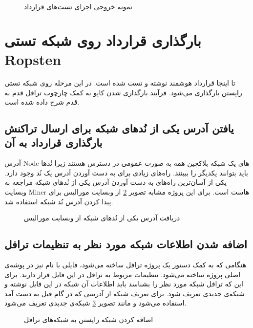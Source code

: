 \begin{figure}
\centerline{}
\caption{نمونه خروجی اجرای تست‌های قرارداد}
\label{fig:test-output}
\end{figure}

\section{بارگذاری قرارداد روی شبکه تستی \gls{Ropsten}}
تا اینجا قرارداد هوشمند نوشته و تست شده است.
در این مرحله روی شبکه تستی راپستن بارگذاری می‌شود.
فرآیند بارگذاری شدن کاپو به کمک چارچوب ترافل قدم به قدم شرح داده شده است.

\subsection{یافتن آدرس یکی از نُد‌های شبکه برای ارسال تراکنش بارگذاری قرارداد به آن}
آدرس
\gls{Node}
های یک شبکه بلاکچین همه به صورت عمومی در دسترس هستند زیرا نُدها باید بتوانند یکدیگر را ببینند.
راه‌های زیادی برای به دست آوردن آدرس یک نُد وجود دارد.
یکی از آسان‌ترین راه‌های به دست آوردن آدرس یکی از نُد‌های شبکه مراجعه به وبسایت
\gls{Miner}
هاست است.
برای این پروژه مشابه تصویر
\ref{fig:moralis}
از وبسایت مورالیس
برای پیدا کردن آدرس نُد شبکه استفاده شد.

\begin{figure}
\centerline{}
\caption{دریافت آدرس یکی از نُد‌های شبکه از وبسایت مورالیس}
\label{fig:moralis}
\end{figure}

\subsection{اضافه شدن اطلاعات شبکه مورد نظر به تنظیمات ترافل}
هنگامی که به کمک دستور
یک پروژه ترافل ساخته می‌شود، فایلی با نام
نیز در پوشه‌ی اصلی پروژه ساخته می‌شود.
تنظیمات مربوط به ترافل در این فایل قرار دارند.
برای این که ترافل شبکه مورد نظر را بشناسد باید اطلاعات آن شبکه در این فایل نوشته و شبکه‌ی جدیدی تعریف شود.
برای تعریف شبکه از آدرسی که در گام قبل به دست آمد استفاده می‌شود و مانند تصویر
\ref{fig:network-config}
شبکه‌ی جدیدی تعریف می‌شود.

\begin{figure}
\centerline{}
\caption{اضافه کردن شبکه راپستن به شبکه‌های ترافل}
\label{fig:network-config}
\end{figure}


